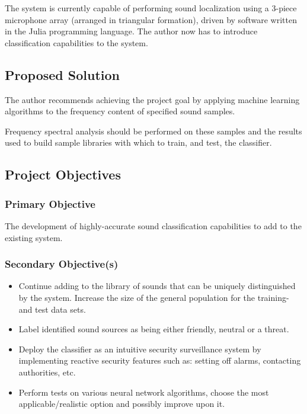 \documentclass[a4paper,12pt]{article}
\numberwithin{equation}{section}
\numberwithin{figure}{section}
\numberwithin{table}{section}
\begin{document}
The system is currently capable of performing sound localization using a 3-piece microphone array (arranged in triangular formation), driven by software written in the Julia programming language. The author now has to introduce classification capabilities to the system.


\subsection{Proposed Solution}
The author recommends achieving the project goal by applying machine learning algorithms to the frequency content of specified sound samples.

Frequency spectral analysis should be performed on these samples and the results used to build sample libraries with which to train, and test, the classifier.





\subsection{Project Objectives}
\subsubsection{Primary Objective}
The development of highly-accurate sound classification capabilities to add to the existing system.

\subsubsection{Secondary Objective(s)}
\begin{itemize}
    \item Continue adding to the library of sounds that can be uniquely distinguished by the system. Increase the size of the general population for the training- and test data sets.
    \item Label identified sound sources as being either friendly, neutral or a threat.
    \item Deploy the classifier as an intuitive security surveillance system by implementing reactive security features such as: setting off alarms, contacting authorities, etc.
    \item Perform tests on various neural network algorithms, choose the most applicable/realistic option and possibly improve upon it.
\end{itemize}
\end{document}
